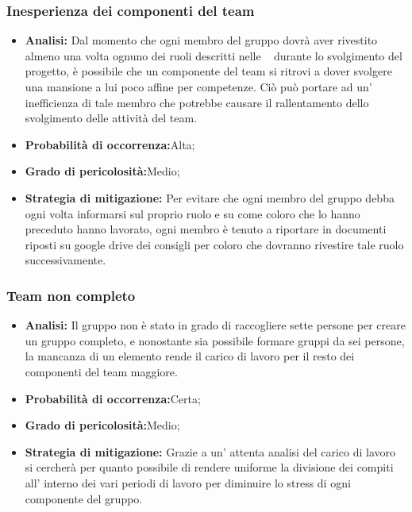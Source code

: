 \subsubsection{Inesperienza dei componenti del team}
	\begin{itemize}
	\item \textbf{Analisi: }Dal momento che ogni membro del gruppo dovrà aver rivestito almeno una volta  ognuno dei ruoli descritti nelle \infoNDP~ durante lo svolgimento del progetto, è possibile che un componente del team si ritrovi a dover svolgere una mansione a lui poco affine per competenze. Ciò può portare ad un' inefficienza di tale membro che potrebbe causare il rallentamento dello svolgimento delle attività del team.
	\item \textbf{Probabilità di occorrenza:}Alta;
	\item \textbf{Grado di pericolosità:}Medio;
	\item \textbf{Strategia di mitigazione: }Per evitare che ogni membro del gruppo debba ogni volta informarsi sul proprio ruolo e su come coloro che lo hanno preceduto hanno lavorato, ogni membro è  tenuto a riportare in documenti riposti su google drive dei consigli per coloro che dovranno rivestire tale ruolo successivamente.
	\end{itemize}
\subsubsection{Team non completo}
	\begin{itemize}
	\item \textbf{Analisi: }Il gruppo non è stato in grado di raccogliere sette persone per creare un gruppo completo, e nonostante sia possibile formare gruppi da sei persone, la mancanza di un elemento rende il carico di lavoro per il resto dei componenti del team maggiore.
	\item \textbf{Probabilità di occorrenza:}Certa;
	\item \textbf{Grado di pericolosità:}Medio;
	\item \textbf{Strategia di mitigazione: }Grazie a un' attenta analisi del carico di lavoro si cercherà per quanto possibile di rendere uniforme la divisione dei compiti all' interno dei vari periodi di lavoro per diminuire lo stress di ogni componente del gruppo.
	\end{itemize}
